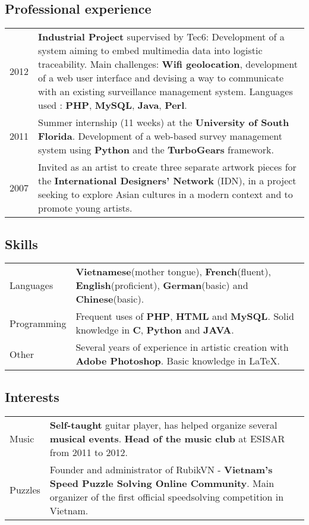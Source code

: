 \documentclass[11pt,a4paper]{article}
\begin{document}
\subsection*{Professional experience}
\noindent \begin{tabular}{@{}p{\annee}p{\texte}@{}}
2012 & \textbf{Industrial Project} supervised by Tec6: Development of a system aiming to embed multimedia data into logistic traceability. Main challenges: \textbf{Wifi geolocation}, development of a web user interface and devising a way to communicate with an existing surveillance management system. Languages used : \textbf{PHP}, \textbf{MySQL}, \textbf{Java}, \textbf{Perl}.\\
2011 & Summer internship (11 weeks) at the \textbf{University of South Florida}. Development of a web-based survey management system using \textbf{Python} and the \textbf{TurboGears} framework.\\
2007 & Invited as an artist to create three separate artwork pieces for the \textbf{International Designers’ Network} (IDN), in a project seeking to explore Asian cultures in a modern context and to promote young artists.\\
\end{tabular}
\subsection*{Skills}
\noindent \begin{tabular}{@{}p{\annee}p{\texte}@{}}
Languages & \textbf{Vietnamese}(mother tongue), \textbf{French}(fluent), \textbf{English}(proficient), \textbf{German}(basic) and \textbf{Chinese}(basic).\\
Programming & Frequent uses of \textbf{PHP}, \textbf{HTML} and \textbf{MySQL}. Solid knowledge in \textbf{C}, \textbf{Python} and \textbf{JAVA}.\\
Other & Several years of experience in artistic creation with \textbf{Adobe Photoshop}. Basic knowledge in \LaTeX.\\
\end{tabular}
\subsection*{Interests}
\noindent \begin{tabular}{@{}p{\annee}p{\texte}@{}}
Music & \textbf{Self-taught} guitar player, has helped organize several \textbf{musical events}. \textbf{Head of the music club} at ESISAR from 2011 to 2012.\\
Puzzles & Founder and administrator of RubikVN - \textbf{Vietnam's Speed Puzzle Solving Online Community}. Main organizer of the first official speedsolving competition in Vietnam.
\end{tabular}
\end{document}
